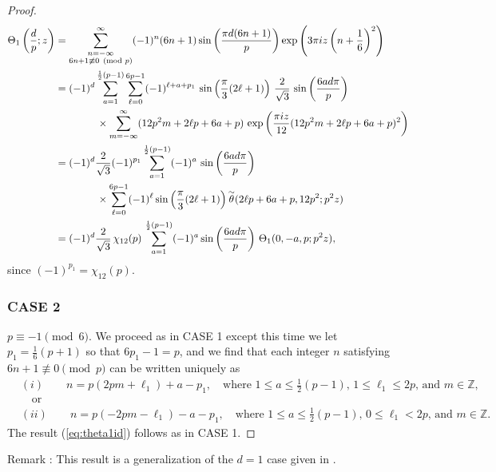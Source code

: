 \documentclass[12pt]{amsart}
\theoremstyle{definition}
\theoremstyle{remark}
\numberwithin{equation}{section}
\newcommand\Lpar[1]{\left(#1\right)}
\newcommand\THA[3]{\Theta_1\Lpar{\frac{#1}{#2};#3}}
\newcommand\ttwid{\overset {\text{\lower 3pt\hbox{$\sim$}}}\theta}
\newcommand\eqn[1]{(\ref{eq:#1})}
\begin{document}
\begin{proof}
\begin{align*}
\THA{d}{p}{z} 
&= \sum_{\substack{n=-\infty \\ 6n+1\not\equiv 0 \pmod{p}}}^\infty
                   (-1)^n (6n+1) \sin\Lpar{\frac{\pi d (6n+1)}{p}}
\exp\Lpar{3\pi iz\Lpar{n + \frac{1}{6}}^2}\\
&=
(-1)^d\sum_{a=1}^{\frac{1}{2}(p-1)}
\sum_{\ell=0}^{6p-1}
(-1)^{\ell + a + p_1} \, \sin\Lpar{\frac{\pi}{3}(2\ell+1)} \, \frac{2}{\sqrt{3}}
\, \sin\Lpar{\frac{6ad\pi}{p}} \\
&\qquad\qquad \times
\sum_{m=-\infty}^\infty (12p^2m + 2\ell p + 6a + p) \,
\exp\Lpar{\frac{\pi iz}{12}(12p^2m + 2\ell p + 6a+p)^2}\\
&=
(-1)^d\frac{2}{\sqrt{3}}(-1)^{p_1}\sum_{a=1}^{\frac{1}{2}(p-1)}(-1)^{a} \, \sin\Lpar{\frac{6 ad \pi}{p}}
 \\
&\qquad\qquad \times
\sum_{\ell=0}^{6p-1} (-1)^{\ell}\sin\Lpar{\frac{\pi}{3}(2\ell+1)}\ttwid(2\ell p + 6a + p,12p^2;p^2z)\\
&=
(-1)^d\frac{2}{\sqrt{3}} \,\chi_{12}(p) \,
\sum_{a=1}^{\frac{1}{2}(p-1)} (-1)^a 
\sin\Lpar{\frac{6ad\pi}{p}} \,\Theta_1(0,-a,p;p^2z),
\end{align*}
since $(-1)^{p_1} = \chi_{12}(p)$.

\subsubsection*{CASE 2} $p\equiv -1 \pmod{6}$. We proceed as in CASE 1
except this time we let  $p_1 = \frac{1}{6}(p+1)$
so that $6p_1-1=p$, and we find  that
each integer $n$ satisfying $6n+1\not\equiv0 \pmod{p}$ can be written uniquely as
\begin{align*}
&(i) \qquad n=p(2pm+\ell_1) + a  - p_1, \quad
     \mbox{where $1\le a \le \frac{1}{2}(p-1)$, $1 \le \ell_1 \le 2p$, and 
           $m \in \mathbb{Z}$,}\\
&\quad\mbox{or}\\
&(ii) \qquad n=p(-2pm-\ell_1) - a  - p_1, \quad
     \mbox{where $1\le a \le \frac{1}{2}(p-1)$, $0 \le \ell_1 < 2p$, and 
           $m \in \mathbb{Z}$.}
\end{align*}
The result \eqn{theta1id} follows as in CASE 1.
\end{proof}
\noindent
Remark : This result is a generalization of the $d=1$ case given in \cite[Proposition 6.8, p.237]{Ga19a}.
\end{document}

